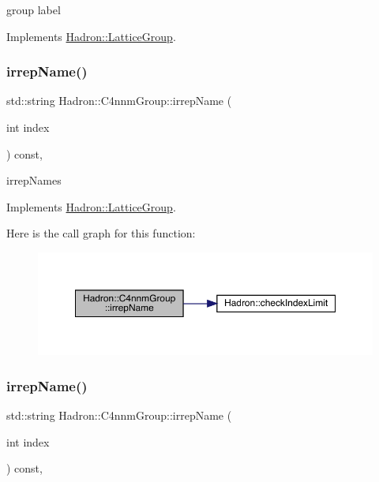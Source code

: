group label 

Implements \mbox{\hyperlink{structHadron_1_1LatticeGroup_a82208a322bf1b1db489f16af38e70087}{Hadron\+::\+Lattice\+Group}}.

\mbox{\label{structHadron_1_1C4nnmGroup_ac2b3ee6989ddbd93bc63c46ac9626997}} 
\subsubsection{\texorpdfstring{irrepName()}{irrepName()}\hspace{0.1cm}{\footnotesize\ttfamily [1/3]}}
{\footnotesize\ttfamily std\+::string Hadron\+::\+C4nnm\+Group\+::irrep\+Name (\begin{DoxyParamCaption}\item[{int}]{index }\end{DoxyParamCaption}) const\hspace{0.3cm}{\ttfamily [inline]}, {\ttfamily [virtual]}}

irrep\+Names 

Implements \mbox{\hyperlink{structHadron_1_1LatticeGroup_a4bc5620218c2a73157e19bc4451fe746}{Hadron\+::\+Lattice\+Group}}.

Here is the call graph for this function\+:
\nopagebreak
\begin{figure}[H]
\begin{center}
\leavevmode
\includegraphics[width=350pt]{d1/dba/structHadron_1_1C4nnmGroup_ac2b3ee6989ddbd93bc63c46ac9626997_cgraph}
\end{center}
\end{figure}
\mbox{\label{structHadron_1_1C4nnmGroup_ac2b3ee6989ddbd93bc63c46ac9626997}} 
\subsubsection{\texorpdfstring{irrepName()}{irrepName()}\hspace{0.1cm}{\footnotesize\ttfamily [2/3]}}
{\footnotesize\ttfamily std\+::string Hadron\+::\+C4nnm\+Group\+::irrep\+Name (\begin{DoxyParamCaption}\item[{int}]{index }\end{DoxyParamCaption}) const\hspace{0.3cm}{\ttfamily [inline]}, {\ttfamily [virtual]}}

